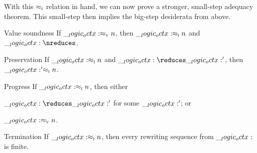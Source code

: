 With this $ \approx\sb{\text{\normalfont\scshape i}} $ relation in hand, we can now prove a stronger, small-step adequacy theorem.
This small-step  then implies the big-step desiderata from above.
%
\begin{theorem}\label{thm:string-rewriting:inc-small-step-adequacy}
  \leavevmode
  \begin{thmdescription}
  \item[Value soundness]
    If $\__logic_octx: \approx\sb{\text{\normalfont\scshape v}} n$, then $\__logic_octx: \approx\sb{\text{\normalfont\scshape i}} n$ and $\octx \nreduces$.
  \item[Preservation]
    If $\__logic_octx: \approx\sb{\text{\normalfont\scshape i}} n$ and $\octx \reduces \octx'$, then $\__logic_octx:' \approx\sb{\text{\normalfont\scshape i}} n$.
  \item[Progress]
    If $\__logic_octx: \approx\sb{\text{\normalfont\scshape i}} n$, then either
    \begin{itemize*}[
      mode=unboxed, label=, afterlabel=,
      before=\unskip:\space,
      itemjoin=;\space, itemjoin*=; or\space%
    ]
    \item $\octx \reduces \octx'$ for some $\__logic_octx:'$; or
    \item $\__logic_octx: \approx\sb{\text{\normalfont\scshape v}} n$.
    \end{itemize*}
  \item[Termination]
    If $\__logic_octx: \approx\sb{\text{\normalfont\scshape i}} n$, then every rewriting sequence from $\__logic_octx:$ is finite.
  \end{thmdescription}
\end{theorem}
%
